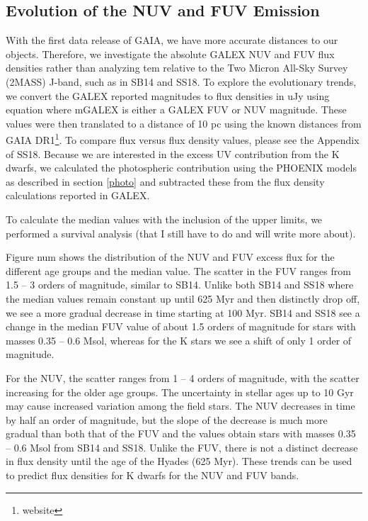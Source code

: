 \documentclass[twocolumn]{aastex62}
\begin{document}
\subsection{Evolution of the NUV and FUV Emission}


With the first data release of GAIA, we have more accurate distances to our objects. Therefore, we investigate the absolute GALEX NUV and FUV flux densities rather than analyzing tem relative to the Two Micron All-Sky Survey (2MASS) J-band, such as in SB14 and SS18. To explore the evolutionary trends, we convert the GALEX reported magnitudes to flux densities in uJy using
equation
where mGALEX is either a GALEX FUV or NUV magnitude. These values were then translated to a distance of 10 pc using the known distances from GAIA DR1\footnote{website}. To compare flux versus flux density values, please see the Appendix of SS18. 
Because we are interested in the excess UV contribution from the K dwarfs, we calculated the photospheric contribution using the PHOENIX models as described in section \ref{photo} and subtracted these from the flux density calculations reported in GALEX. 

To calculate the median values with the inclusion of the upper limits, we performed a survival analysis (that I still have to do and will write more about). 

Figure num shows the distribution of the NUV and FUV excess flux for the different age groups and the median value. The scatter in the FUV ranges from 1.5 – 3 orders of magnitude, similar to SB14. Unlike both SB14 and SS18 where the median values remain constant up until 625 Myr and then distinctly drop off, we see a more gradual decrease in time starting at 100 Myr. SB14 and SS18 see a change in the median FUV value of about 1.5 orders of magnitude for stars with masses 0.35 – 0.6 Msol, whereas for the K stars we see a shift of only 1 order of magnitude. 

For the NUV, the scatter ranges from 1 – 4 orders of magnitude, with the scatter increasing for the older age groups. The uncertainty in stellar ages up to 10 Gyr may cause increased variation among the field stars. The NUV decreases in time by half an order of magnitude, but the slope of the decrease is much more gradual than both that of the FUV and the values obtain stars with masses 0.35 – 0.6 Msol from SB14 and SS18. Unlike the FUV, there is not a distinct decrease in flux density until the age of the Hyades (625 Myr). These trends can be used to predict flux densities for K dwarfs for the NUV and FUV bands. 
\end{document}
